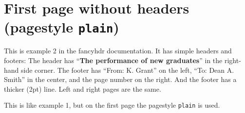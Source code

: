 \documentclass{article}
\begin{document}
\thispagestyle{plain}

\section*{First page without headers (pagestyle \texttt{plain})}
\label{sec:first-page-without}

\begin{boxedminipage}{\textwidth}
This is example 2 in the fancyhdr documentation. It has simple headers and footers:
The header has {``\textbf{The performance of new graduates}''} in the right-hand side corner.
The footer has ``From: K. Grant'' on the left, ``To: Dean A. Smith'' in the center, and the page number on the right. And the footer has a thicker (2pt) line. Left and right pages are the same.

This is like example 1, but on the first page the pagestyle \texttt{plain} is used.
\end{boxedminipage}

\bigskip

\lipsum
\end{document}
